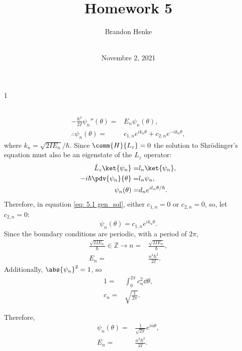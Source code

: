 \documentclass[a4paper,12pt,twoside]{article}
\title{Homework 5}
\author{
	Brandon Henke\\
	\textit{\course}\\
	\textit{\professor}
}
\date{Novembre 2, 2021}
\newcommand{\mcols}{0}
\begin{document}

\maketitle
\if\mcols1
\begin{multicols*}{2}
\fi

\setcounter{section}{5}
\subsection{}
\subsubsection{}
\begin{align}
	-\frac{\hbar^2}{2I}\psi_n''(\theta) =& E_n \psi_n(\theta),\\
	\therefore \psi_n(\theta) =& c_{1,n} e^{ik_n\theta}+c_{2,n} e^{-ik_n\theta},
	\label{eq: 5.1 gen_sol}
\end{align}
where $ k_n = \sqrt{2IE_n}/\hbar$.
Since $\comm{H}{L_z}=0$ the solution to Shr\"odinger's equation must also be an eigenstate of the $L_z$ operator:
\begin{align}
	\hat{L}_z \ket{\psi_n} =& l_n \ket{\psi_n},\\
	-i\hbar\pdv{\psi_n}{\theta} =& l_n \psi_n,\\
	\psi_n (\theta) =& d_n e^{i l_n \theta/\hbar}.
\end{align}
Therefore, in equation \ref{eq: 5.1 gen_sol}, either $c_{1,n} = 0$ or $c_{2,n} = 0$, so, let $c_{2,n} = 0$:
\begin{equation}
	\psi_n(\theta) = c_{1,n} e^{i k_n \theta}.
	\label{eq: 5.1 sol}
\end{equation}
Since the boundary conditions are periodic, with a period of $2\pi$,
\begin{align}
	\frac{\sqrt{2IE_n}}{\hbar} \in \mathbb{Z}\rightarrow n =& \frac{\sqrt{2IE_n}}{\hbar},\\
	E_n =& \frac{n^2\hbar^2}{2I}.
\end{align}
Additionally, $\abs{\psi_n}^2 = 1$, so
\begin{align}
	1 =& \int_0^{2\pi} c_n^2 \dd{\theta},\\
	c_n =& \sqrt{\frac{1}{2\pi}}.
\end{align}

Therefore,
\begin{align}
	\psi_n(\theta) =& \frac{1}{\sqrt{2\pi}}e^{i n\theta},\\
	E_n =& \frac{n^2\hbar^2}{2I}.
\end{align}


\end{multicols*}
\end{document}
